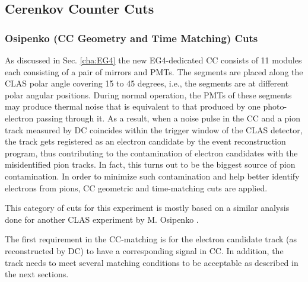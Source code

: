 \subsection{Cerenkov Counter Cuts}
\subsubsection{ Osipenko (CC Geometry and Time Matching) Cuts}
\label{osiCuts}
As discussed in Sec. \ref{cha:EG4} %
the new EG4-dedicated CC consists of 11 modules %
each consisting of a pair %
of mirrors and PMTs. The segments are placed along the CLAS polar angle covering 15 to 45 degrees, i.e., the segments are at different polar angular positions. %
During normal operation, the PMTs of these segments may produce %
thermal noise that is equivalent to that produced by one photo-electron passing through it. As a result, when a noise pulse in the CC and a pion track measured by DC coincides within the trigger window of the CLAS detector, %
the track gets registered as an electron candidate by the event reconstruction program, thus contributing to the contamination of electron candidates %
with the misidentified pion tracks. In fact, this turns out to be the biggest source of pion contamination. In order to minimize such contamination and help better identify electrons from pions, %
CC geometric and time-matching cuts are applied.

This category of cuts for this experiment is %
mostly based on a similar analysis done for another CLAS experiment by M. Osipenko \cite{cnOsipenko, anaNoteXZheng}.%


The first requirement in the CC-matching is for the electron candidate track (as reconstructed by DC) to have a corresponding signal in CC. In addition, the track needs to meet several %
matching conditions to be acceptable as described in the next sections.


